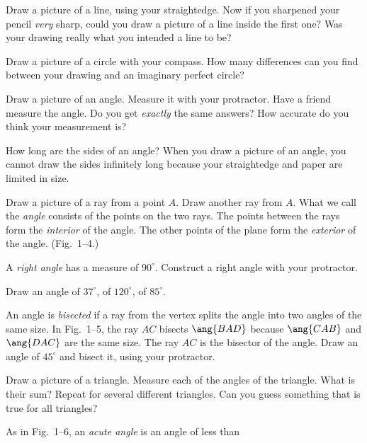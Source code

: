 \documentclass[11pt]{book}
\theoremstyle{bkplain}
\theoremstyle{XIplainnote}
\theoremstyle{bkplain}
\theoremstyle{bkplain}
\begin{document}
\begin{exercisecols}
\begin{exlist}
\item Draw a picture of a line, using your straightedge. Now if you sharpened
      your pencil \emph{very} sharp, could you draw a picture of a line inside the
      first one? Was your drawing really what you intended a line to be?
\item Draw a picture of a circle with your compass. How many differences can you
      find between your drawing and an imaginary perfect circle?
\item Draw a picture of an angle. Measure it with your protractor. Have a friend
      measure the angle. Do you get \emph{exactly} the same answers? How accurate
      do you think your measurement is?
\item How long are the sides of an angle? When you draw a picture of an angle,
      you cannot draw the sides infinitely long because your straightedge and
      paper are limited in size.
\item Draw a picture of a ray from a point $A$. Draw another ray from $A$. What
      we call the \emph{angle} consists of the points on the two rays. The points
      between the rays form the \emph{interior} of the angle. The other points of
      the plane form the \emph{exterior} of the angle. (Fig.~1--4.)
\exfig{\FIGIFOUR}
\item A \emph{right angle} has a measure of $90^\circ$. Construct a right angle
      with your protractor.
\item Draw an angle of $37^\circ$, of $120^\circ$, of $85^\circ$.
\item An angle is \emph{bisected} if a ray from the vertex splits the angle into
      two angles of the same size. In Fig.~1--5, the ray $AC$ bisects
      $\ang{BAD}$ because $\ang{CAB}$ and $\ang{DAC}$ are the same size. The ray
      $AC$ is the bisector of the angle. Draw an angle of $45^\circ$ and bisect
      it, using your protractor.
\exfig{\FIGIFIVE}
\item Draw a picture of a triangle. Measure each of the angles of the triangle.
      What is their sum? Repeat for several different triangles. Can you guess
      something that is true for all triangles?
\item As in Fig.~1--6, an \emph{acute angle} is an angle of less than

\end{exlist}
\end{exercisecols}
\end{document}
